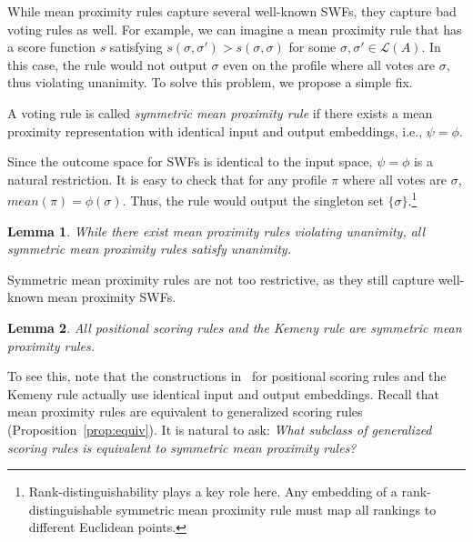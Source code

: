 \documentclass[10pt,letterpaper]{article}
\newcommand{\calL}{{\mathcal{L}}}
\newcommand{\rank}{{\calL(A)}}
\newtheorem{lemma}{Lemma}
\newenvironment{definition}[1][Definition]{\begin{trivlist}
\item[\hskip \labelsep {\bfseries #1}]}{\end{trivlist}}
\begin{document}


While mean proximity rules capture several well-known SWFs, they capture bad voting rules as well. For example, we can imagine a mean proximity rule that has a score function $s$ satisfying $s(\sigma,\sigma') > s(\sigma,\sigma)$ for some $\sigma,\sigma' \in \rank$. In this case, the rule would not output $\sigma$ even on the profile where all votes are $\sigma$, thus violating unanimity. To solve this problem, we propose a simple fix. 

\begin{definition}[Symmetric Mean Proximity Rules]
A voting rule is called \emph{symmetric mean proximity rule} if there exists a mean proximity representation with identical input and output embeddings, i.e., $\psi = \phi$. 
\end{definition} 

Since the outcome space for SWFs is identical to the input space, $\psi = \phi$ is a natural restriction. It is easy to check that for any profile $\pi$ where all votes are $\sigma$, $mean(\pi) = \phi(\sigma)$. Thus, the rule would output the singleton set $\{\sigma\}$.\footnote{Rank-distinguishability plays a key role here. Any embedding of a rank-distinguishable symmetric mean proximity rule must map all rankings to different Euclidean points.} 


\begin{lemma}
While there exist mean proximity rules violating unanimity, all symmetric mean proximity rules satisfy unanimity.
\end{lemma}

Symmetric mean proximity rules are not too restrictive, as they still capture well-known mean proximity SWFs. 
\begin{lemma}
All positional scoring rules and the Kemeny rule are symmetric mean proximity rules.
\label{lem:symmetric-captures}
\end{lemma}

To see this, note that the constructions in~\cite{Zwicker08a} for positional scoring rules and the Kemeny rule actually use identical input and output embeddings. 
Recall that mean proximity rules are equivalent to generalized scoring rules (Proposition~\ref{prop:equiv}). It is natural to ask: \emph{What subclass of generalized scoring rules is equivalent to symmetric mean proximity rules?} 
\end{document}
